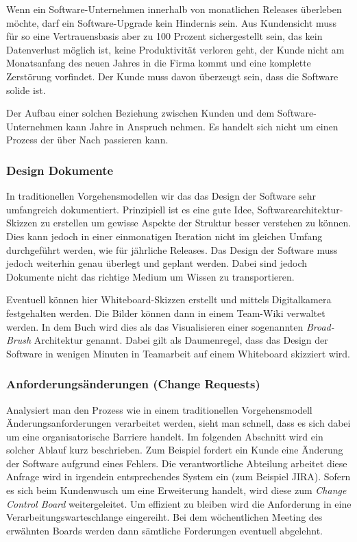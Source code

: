 Wenn ein Software-Unternehmen innerhalb von monatlichen Releases überleben möchte, darf ein Software-Upgrade kein Hindernis sein. Aus Kundensicht muss für so eine Vertrauensbasis aber zu 100 Prozent sichergestellt sein, das kein Datenverlust möglich ist, keine Produktivität verloren geht, der Kunde nicht am Monatsanfang des neuen Jahres in die Firma kommt und eine komplette Zerstörung vorfindet. Der Kunde muss davon überzeugt sein, dass die Software solide ist. 

Der Aufbau einer solchen Beziehung zwischen Kunden und dem Software-Unternehmen kann Jahre in Anspruch nehmen. Es handelt sich nicht um einen Prozess der über Nach passieren kann.

\subsubsection{Design Dokumente}
In traditionellen Vorgehensmodellen wir das das Design der Software sehr umfangreich dokumentiert. Prinzipiell ist es eine gute Idee, Softwarearchitektur-Skizzen zu erstellen um gewisse Aspekte der Struktur besser verstehen zu können. Dies kann jedoch in einer einmonatigen Iteration nicht im gleichen Umfang durchgeführt werden, wie für jährliche Releases. Das Design der Software muss jedoch weiterhin genau überlegt und geplant werden. Dabei sind jedoch Dokumente nicht das richtige Medium um Wissen zu transportieren. 

Eventuell können hier Whiteboard-Skizzen erstellt und mittels Digitalkamera festgehalten werden. Die Bilder können dann in einem Team-Wiki verwaltet werden. In dem Buch \cite{goos} wird dies als das Visualisieren einer sogenannten \emph{Broad-Brush} Architektur genannt. Dabei gilt als Daumenregel, dass das Design der Software in wenigen Minuten in Teamarbeit auf einem Whiteboard skizziert wird. 

\subsubsection{Anforderungsänderungen (Change Requests)}
Analysiert man den Prozess wie in einem traditionellen Vorgehensmodell Änderungsanforderungen verarbeitet werden, sieht man schnell, dass es sich dabei um eine organisatorische Barriere handelt. Im folgenden Abschnitt wird ein solcher Ablauf kurz beschrieben. Zum Beispiel fordert ein Kunde eine Änderung der Software aufgrund eines Fehlers. Die verantwortliche Abteilung arbeitet diese Anfrage wird in irgendein entsprechendes System ein (zum Beispiel JIRA). Sofern es sich beim Kundenwusch um eine Erweiterung handelt, wird diese zum \emph{Change Control Board} \cite{dpunktkonfig2008} weitergeleitet. Um effizient zu bleiben wird die Anforderung in eine Verarbeitungswarteschlange eingereiht. Bei dem wöchentlichen Meeting des erwähnten Boards werden dann sämtliche Forderungen eventuell abgelehnt.

